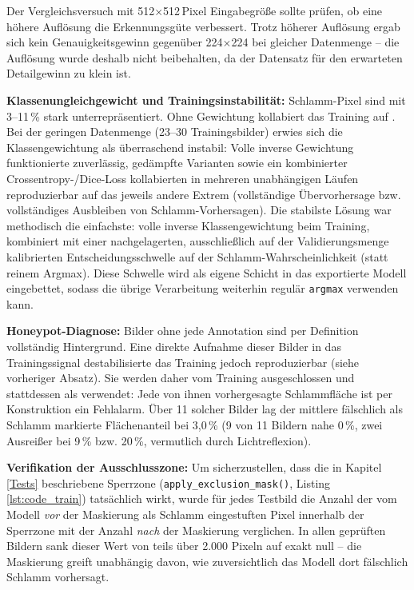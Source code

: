 Der Vergleichsversuch mit 512$\times$512\,Pixel Eingabegröße sollte prüfen, ob eine höhere Auflösung die Erkennungsgüte verbessert. Trotz höherer Auflösung ergab sich kein Genauigkeitsgewinn gegenüber 224$\times$224 bei gleicher Datenmenge -- die Auflösung wurde deshalb nicht beibehalten, da der Datensatz für den erwarteten Detailgewinn zu klein ist.

\textbf{Klassenungleichgewicht und Trainingsinstabilität:} Schlamm-Pixel sind mit 3--11\,\% stark unterrepräsentiert. Ohne Gewichtung kollabiert das Training auf . Bei der geringen Datenmenge (23--30 Trainingsbilder) erwies sich die Klassengewichtung als überraschend instabil: Volle inverse Gewichtung funktionierte zuverlässig, gedämpfte Varianten sowie ein kombinierter Crossentropy-/Dice-Loss kollabierten in mehreren unabhängigen Läufen reproduzierbar auf das jeweils andere Extrem (vollständige Übervorhersage bzw. vollständiges Ausbleiben von Schlamm-Vorhersagen). Die stabilste Lösung war methodisch die einfachste: volle inverse Klassengewichtung beim Training, kombiniert mit einer nachgelagerten, ausschließlich auf der Validierungsmenge kalibrierten Entscheidungsschwelle auf der Schlamm-Wahrscheinlichkeit (statt reinem Argmax). Diese Schwelle wird als eigene Schicht in das exportierte Modell eingebettet, sodass die übrige Verarbeitung weiterhin regulär \texttt{argmax} verwenden kann.

\textbf{Honeypot-Diagnose:} Bilder ohne jede Annotation sind per Definition vollständig Hintergrund. Eine direkte Aufnahme dieser Bilder in das Trainingssignal destabilisierte das Training jedoch reproduzierbar (siehe vorheriger Absatz). Sie werden daher vom Training ausgeschlossen und stattdessen als  verwendet: Jede von ihnen vorhergesagte Schlammfläche ist per Konstruktion ein Fehlalarm. Über 11 solcher Bilder lag der mittlere fälschlich als Schlamm markierte Flächenanteil bei 3,0\,\% (9 von 11 Bildern nahe 0\,\%, zwei Ausreißer bei 9\,\% bzw. 20\,\%, vermutlich durch Lichtreflexion).

\textbf{Verifikation der Ausschlusszone:} Um sicherzustellen, dass die in Kapitel \ref{Tests} beschriebene Sperrzone (\texttt{apply\_exclusion\_mask()}, Listing \ref{lst:code_train}) tatsächlich wirkt, wurde für jedes Testbild die Anzahl der vom Modell \emph{vor} der Maskierung als Schlamm eingestuften Pixel innerhalb der Sperrzone mit der Anzahl \emph{nach} der Maskierung verglichen. In allen geprüften Bildern sank dieser Wert von teils über 2.000 Pixeln auf exakt null -- die Maskierung greift unabhängig davon, wie zuversichtlich das Modell dort fälschlich Schlamm vorhersagt.

